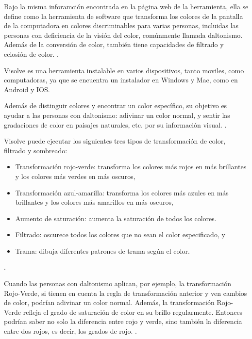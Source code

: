 \documentclass[10pt]{article}
\begin{document}
Bajo la misma inforamción encontrada en la página web de la herramienta, ella se define como la herramienta de software que transforma los colores de la pantalla de la computadora en colores discriminables para varias personas, incluidas las personas con deficiencia de la visión del color, comúnmente llamada daltonismo. Además de la conversión de color, también tiene capacidades de filtrado y eclosión de color. 
\cite{IEEEreferencias:Ref3}.

\setlength{\parskip}{2mm}

Visolve es una herramienta instalable en varios dispositivos, tanto moviles, como computadoras, ya que se encuentra un instalador en Windows y Mac, como en Android y IOS.

\setlength{\parskip}{2mm}

Además de distinguir colores y encontrar un color específico, su objetivo es ayudar a las personas con daltonismo: adivinar un color normal, y sentir las gradaciones de color en paisajes naturales, etc. por su información visual.
\cite{IEEEreferencias:Ref3}.

\setlength{\parskip}{2mm}

Visolve puede ejecutar los siguientes tres tipos de transformación de color, filtrado y sombreado:

\begin{itemize}
    \item Transformación rojo-verde: transforma los colores más rojos en más brillantes y los colores más verdes en más oscuros,
    \item Transformación azul-amarilla: transforma los colores más azules en más brillantes y los colores más amarillos en más oscuros,
    \item Aumento de saturación: aumenta la saturación de todos los colores.
    \item Filtrado: oscurece todos los colores que no sean el color especificado, y
    \item Trama: dibuja diferentes patrones de trama según el color.
\end{itemize}
\cite{IEEEreferencias:Ref3}.

Cuando las personas con daltonismo aplican, por ejemplo, la transformación Rojo-Verde, si tienen en cuenta la regla de transformación anterior y ven cambios de color, podrían adivinar un color normal. Además, la transformación Rojo-Verde refleja el grado de saturación de color en su brillo regularmente. Entonces podrían saber no solo la diferencia entre rojo y verde, sino también la diferencia entre dos rojos, es decir, los grados de rojo.
\cite{IEEEreferencias:Ref3}.
\end{document}
